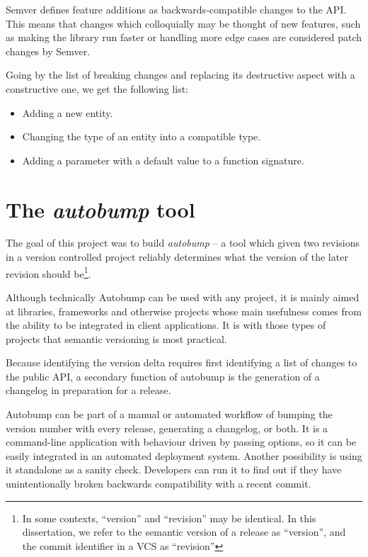 \documentclass{l4proj}
\begin{document}
Semver defines feature additions as backwards-compatible changes to
the API. This means that changes which colloquially may be thought of
new features, such as making the library run faster or handling more
edge cases are considered patch changes by Semver.

Going by the list of breaking changes and replacing its destructive
aspect with a constructive one, we get the following list:

\begin{itemize}
\item Adding a new entity.
\item Changing the type of an entity into a compatible type.
\item Adding a parameter with a default value to a function signature.
\end{itemize}

\section{The \textit{autobump} tool}

The goal of this project was to build \textit{autobump} -- a tool which
given two revisions in a version controlled project reliably
determines what the version of the later revision should
be\footnote{In some contexts, ``version'' and ``revision'' may be
identical. In this dissertation, we refer to the semantic version of a
release as ``version'', and the commit identifier in a VCS as ``revision''}.

Although technically Autobump can be used with any project, it is
mainly aimed at libraries, frameworks and otherwise projects whose
main usefulness comes from the ability to be integrated in client
applications. It is with those types of projects that semantic
versioning is most practical.

Because identifying the version delta requires first identifying a
list of changes to the public API, a secondary function of autobump is
the generation of a changelog in preparation for a release.

Autobump can be part of a manual or automated workflow of bumping the
version number with every release, generating a changelog, or both. It
is a command-line application with behaviour driven by passing
options, so it can be easily integrated in an automated deployment
system. Another possibility is using it standalone as a sanity check.
Developers can run it to find out if they have unintentionally broken
backwards compatibility with a recent commit.
\end{document}
